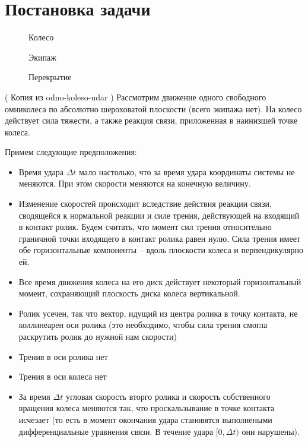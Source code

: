 
\section{Постановка задачи}

\begin{figure}[h]
        \centering
        \caption{Колесо}
        \label{fig:wheel}
    \endminipage
        \centering
        \caption{Экипаж}
        \label{fig:vehicle}
    \endminipage
        \centering
        \caption{Перекрытие}
        \label{fig:overlap}
    \endminipage
\end{figure}

( Копия из odno-koleso-udar ) \newline
Рассмотрим движение одного свободного омниколеса по абсолютно шероховатой плоскости (всего экипажа нет). На колесо действует сила тяжести, а также реакция связи, приложенная в наинизшей точке колеса.

Примем следующие предположения:
\begin{itemize}
\item Время удара $\Delta t$ мало настолько, что за время удара координаты системы не меняются. При этом скорости меняются на конечную величину.
\item Изменение скоростей происходит вследствие действия реакции связи, сводящейся к нормальной реакции и силе трения, действующей на входящий в контакт ролик. Будем считать, что момент сил трения относительно граничной точки входящего в контакт ролика равен нулю. Сила трения имеет обе горизонтальные компоненты -- вдоль плоскости колеса и перпендикулярно ей.
\item Все время движения колеса на его диск действует некоторый горизонтальный момент, сохраняющий плоскость диска колеса вертикальной.
\item Ролик усечен, так что вектор, идущий из центра ролика в точку контакта, не коллинеарен оси ролика (это необходимо, чтобы сила трения смогла раскрутить ролик до нужной нам скорости)
\item Трения в оси ролика нет
\item Трения в оси колеса нет
\item За время $\Delta t$ угловая скорость вторго ролика и скорость собственного вращения колеса меняются так, что проскальзывание в точке контакта исчезает (то есть в момент окончания удара становятся выполнеными дифференциальные уравнения связи. В течение удара $[0,\Delta t)$ они нарушены).
\end{itemize}


